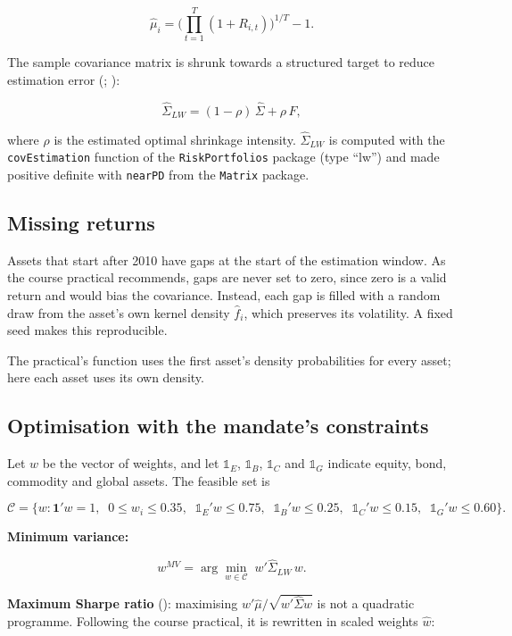 \documentclass[11pt,preprint]{elsarticle}
\numberwithin{equation}{section}
\numberwithin{figure}{section}
\numberwithin{table}{section}
\begin{document}
\[
\hat{\mu}_i = \Big(\prod_{t=1}^{T}(1+R_{i,t})\Big)^{1/T} - 1.
\]

The sample covariance matrix is shrunk towards a structured target to
reduce estimation error
(;
):

\[
\hat{\Sigma}_{LW} = (1-\rho)\,\hat{\Sigma} + \rho\, F,
\]

where \(\rho\) is the estimated optimal shrinkage intensity.
\(\hat{\Sigma}_{LW}\) is computed with the \texttt{covEstimation}
function of the \texttt{RiskPortfolios} package (type ``lw'') and made
positive definite with \texttt{nearPD} from the \texttt{Matrix} package.

\subsection{Missing returns}\label{missing-returns}

Assets that start after 2010 have gaps at the start of the estimation
window. As the course practical recommends, gaps are never set to zero,
since zero is a valid return and would bias the covariance. Instead,
each gap is filled with a random draw from the asset's own kernel
density \(\hat{f}_i\), which preserves its volatility. A fixed seed
makes this reproducible.

The practical's function uses the first asset's density probabilities
for every asset; here each asset uses its own density.

\subsection{Optimisation with the mandate's
constraints}\label{optimisation-with-the-mandates-constraints}

Let \(w\) be the vector of weights, and let \(\mathbb{1}_E\),
\(\mathbb{1}_B\), \(\mathbb{1}_C\) and \(\mathbb{1}_G\) indicate equity,
bond, commodity and global assets. The feasible set is

\[
\mathcal{C} = \Big\{ w : \mathbf{1}'w = 1,\;\; 0 \le w_i \le 0.35,\;\; \mathbb{1}_E'w \le 0.75,\;\; \mathbb{1}_B'w \le 0.25,\;\; \mathbb{1}_C'w \le 0.15,\;\; \mathbb{1}_G'w \le 0.60 \Big\}.
\]

\textbf{Minimum variance:}

\[
w^{MV} = \arg\min_{w \in \mathcal{C}} \; w'\hat{\Sigma}_{LW}\, w.
\]

\textbf{Maximum Sharpe ratio}
(): maximising
\(w'\hat{\mu} / \sqrt{w'\hat{\Sigma}w}\) is not a quadratic programme.
Following the course practical, it is rewritten in scaled weights
\(\hat{w}\):
\end{document}
